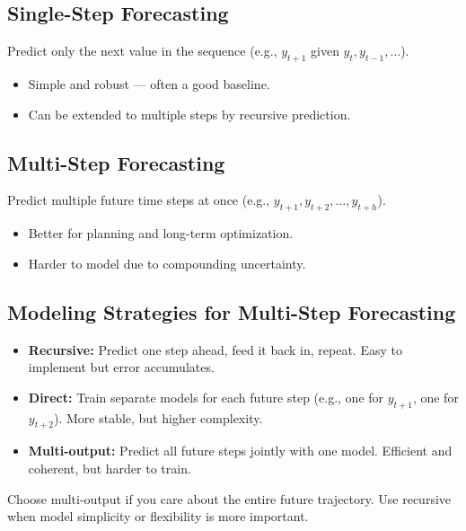 \documentclass[12pt,openany]{book}
\begin{document}
\subsection*{Single-Step Forecasting}

Predict only the next value in the sequence (e.g., $y_{t+1}$ given $y_t, y_{t-1}, \dots$).

\begin{itemize}
    \item Simple and robust — often a good baseline.
    \item Can be extended to multiple steps by recursive prediction.
\end{itemize}


\subsection*{Multi-Step Forecasting}

Predict multiple future time steps at once (e.g., $y_{t+1}, y_{t+2}, \dots, y_{t+h}$).

\begin{itemize}
    \item Better for planning and long-term optimization.
    \item Harder to model due to compounding uncertainty.
\end{itemize}


\subsection*{Modeling Strategies for Multi-Step Forecasting}

\begin{itemize}
    \item \textbf{Recursive:} Predict one step ahead, feed it back in, repeat. Easy to implement but error accumulates.
    \item \textbf{Direct:} Train separate models for each future step (e.g., one for $y_{t+1}$, one for $y_{t+2}$). More stable, but higher complexity.
    \item \textbf{Multi-output:} Predict all future steps jointly with one model. Efficient and coherent, but harder to train.
\end{itemize}

\begin{notebox}
Choose multi-output if you care about the entire future trajectory. Use recursive when model simplicity or flexibility is more important.
\end{notebox}
\end{document}
